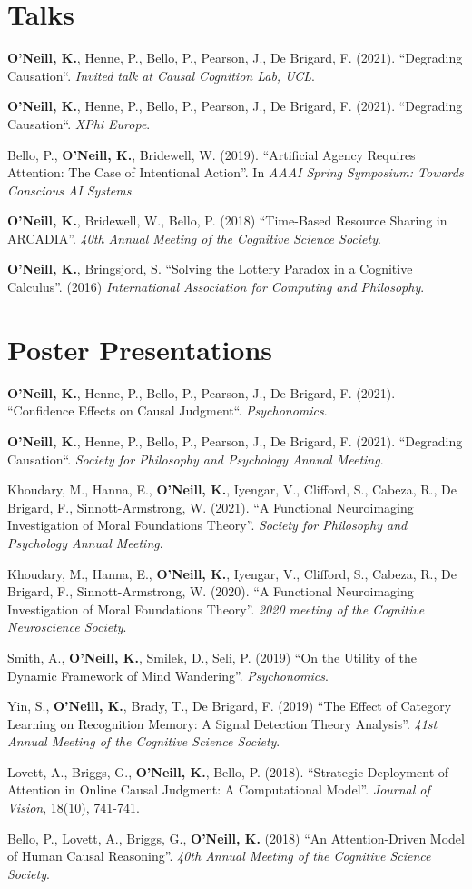 \section{Talks}
\textbf{O'Neill, K.}, Henne, P., Bello, P., Pearson, J., De Brigard,
F. (2021). ``Degrading Causation``. \emph{Invited talk at Causal
Cognition Lab, UCL}.

\textbf{O'Neill, K.}, Henne, P., Bello, P., Pearson, J., De Brigard,
F. (2021). ``Degrading Causation``. \emph{XPhi Europe}.

Bello, P., \textbf{O'Neill, K.}, Bridewell, W. (2019). ``Artificial
Agency Requires Attention: The Case of Intentional Action''. In
\emph{AAAI Spring Symposium: Towards Conscious AI Systems}.

\textbf{O'Neill, K.}, Bridewell, W., Bello, P. (2018) ``Time-Based
Resource Sharing in ARCADIA''. \emph{40th Annual Meeting of the
Cognitive Science Society}.

\textbf{O’Neill, K.}, Bringsjord, S. ``Solving the Lottery Paradox in
a Cognitive Calculus''. (2016) \emph{International Association for
Computing and Philosophy}.

\line\section{Poster Presentations}
\textbf{O'Neill, K.}, Henne, P., Bello, P., Pearson, J., De Brigard,
F. (2021). ``Confidence Effects on Causal
Judgment``. \emph{Psychonomics}.

\textbf{O'Neill, K.}, Henne, P., Bello, P., Pearson, J., De Brigard,
F. (2021). ``Degrading Causation``. \emph{Society for Philosophy and
Psychology Annual Meeting}.

Khoudary, M., Hanna, E., \textbf{O’Neill, K.}, Iyengar, V., Clifford,
S., Cabeza, R., De Brigard, F., Sinnott-Armstrong, W. (2021). ``A
Functional Neuroimaging Investigation of Moral Foundations
Theory''. \emph{Society for Philosophy and Psychology Annual Meeting}.

Khoudary, M., Hanna, E., \textbf{O’Neill, K.}, Iyengar, V., Clifford,
S., Cabeza, R., De Brigard, F., Sinnott-Armstrong, W. (2020). ``A
Functional Neuroimaging Investigation of Moral Foundations
Theory''. \emph{2020 meeting of the Cognitive Neuroscience Society}.

Smith, A., \textbf{O'Neill, K.}, Smilek, D., Seli, P. (2019) ``On the
Utility of the Dynamic Framework of Mind
Wandering''. \emph{Psychonomics}.

Yin, S., \textbf{O'Neill, K.}, Brady, T., De Brigard, F. (2019) ``The
Effect of Category Learning on Recognition Memory: A Signal Detection
Theory Analysis''. \emph{41st Annual Meeting of the Cognitive Science
Society}.

Lovett, A., Briggs, G., \textbf{O'Neill, K.}, Bello,
P. (2018). ``Strategic Deployment of Attention in Online Causal
Judgment: A Computational Model''. \emph{Journal of Vision}, 18(10),
741-741.

Bello, P., Lovett, A., Briggs, G., \textbf{O'Neill, K.} (2018) ``An
Attention-Driven Model of Human Causal Reasoning''. \emph{40th Annual
Meeting of the Cognitive Science Society}.
